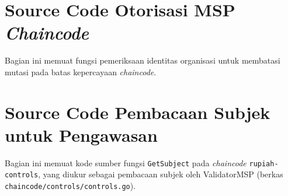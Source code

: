 
\section{Source Code Otorisasi MSP \textit{Chaincode}}
Bagian ini memuat fungsi pemeriksaan identitas organisasi untuk membatasi mutasi pada batas kepercayaan \textit{chaincode}.


\section{Source Code Pembacaan Subjek untuk Pengawasan}
Bagian ini memuat kode sumber fungsi \texttt{GetSubject} pada \textit{chaincode} \texttt{rupiah-controls}, yang diukur sebagai pembacaan subjek oleh ValidatorMSP (berkas \texttt{chaincode/controls/controls.go}).


